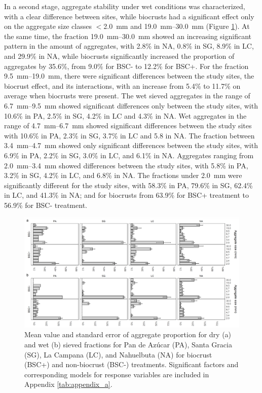 In a second stage, aggregate stability under wet conditions was characterized, with a clear difference between sites, while biocrusts had a significant effect only on the aggregate size classes $<$\SI{2.0}{\milli\meter} and \SIrange[range-phrase=--,range-units=single]{19.0}{30.0}{\milli\meter} (Figure \ref{fig:M1-F3}). At the same time, the fraction \SIrange[range-phrase=--,range-units=single]{19.0}{30.0}{\milli\meter} showed an increasing significant pattern in the amount of aggregates, with 2.8\% in NA, 0.8\% in SG, 8.9\% in LC, and 29.9\% in NA, while biocrusts significantly increased the proportion of aggregates by 35.6\%, from 9.0\% for BSC- to 12.2\% for BSC+. For the fraction \SIrange[range-phrase=--,range-units=single]{9.5}{19.0}{\milli\meter}, there were significant differences between the study sites, the biocrust effect, and its interactions, with an increase from 5.4\% to 11.7\% on average when biocrusts were present. The wet sieved aggregates in the range of \SIrange[range-phrase=--,range-units=single]{6.7}{9.5}{\milli\meter} showed significant differences only between the study sites, with 10.6\% in PA, 2.5\% in SG, 4.2\% in LC and 4.3\% in NA. Wet aggregates in the range of \SIrange[range-phrase=--,range-units=single]{4.7}{6.7}{\milli\meter} showed significant differences between the study sites with 10.6\% in PA, 2.3\% in SG, 3.7\% in LC and 5.8 in NA. The fraction between \SIrange[range-phrase=--,range-units=single]{3.4}{4.7}{\milli\meter} showed only significant differences between the study sites, with 6.9\% in PA, 2.2\% in SG, 3.0\% in LC, and 6.1\% in NA. Aggregates ranging from \SIrange[range-phrase=--,range-units=single]{2.0}{3.4}{\milli\meter} showed differences between the study sites, with 5.8\% in PA, 3.2\% in SG, 4.2\% in LC, and 6.8\% in NA. The fractions under \SI{2.0}{\milli\meter} were significantly different for the study sites, with 58.3\% in PA, 79.6\% in SG, 62.4\% in LC, and 41.3\% in NA; and for biocrusts from 63.9\% for BSC+ treatment to 56.9\% for BSC- treatment.

\begin{figure}[H]
	\centering
	\includegraphics[width=1\textwidth]{img/M1-Figure_3.png}
	\caption{Mean value and standard error of aggregate proportion for dry (a) and wet (b) sieved fractions for Pan de Azúcar (PA), Santa Gracia (SG), La Campana (LC), and Nahuelbuta (NA) for biocrust (BSC+) and non-biocrust (BSC-) treatments. Significant factors and corresponding models for response variables are included in Appendix \ref{tab:appendix_a}.}
	\label{fig:M1-F3}
\end{figure}


